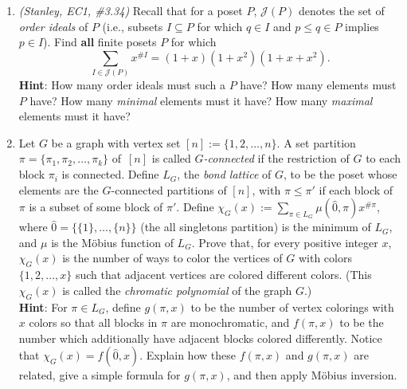 \documentclass[11pt]{article}
\begin{document}
\begin{enumerate}
\item \emph{(Stanley, EC1, \#3.34)} Recall that for a poset $P$, $\mathcal{J}(P)$ denotes the set of \emph{order ideals} of $P$ (i.e., subsets $I\subseteq P$ for which $q\in I$ and $p\leq q\in P$ implies $p\in I$). Find {\bf all} finite posets $P$ for which
\[ \sum_{I \in \mathcal{J}(P)} x^{\#I} = (1+x)(1+x^2)(1+x+x^2).\]
{\bf Hint}: How many order ideals must such a $P$ have? How many elements must $P$ have? How many \emph{minimal} elements must it have? How many \emph{maximal} elements must it have?

\item Let $G$ be a graph with vertex set $[n]:=\{1,2,\ldots,n\}$. A set partition $\pi=\{\pi_1,\pi_2,\ldots,\pi_k\}$ of~$[n]$ is called \emph{$G$-connected} if the restriction of $G$ to each block $\pi_i$ is connected. Define $L_G$, the \emph{bond lattice} of $G$, to be the poset whose elements are the $G$-connected partitions of $[n]$, with $\pi \leq \pi'$ if each block of $\pi$ is a subset of some block of $\pi'$. Define $\chi_G(x) := \sum_{\pi \in L_G} \mu(\hat{0},\pi) x^{\#\pi}$, where $\hat{0} = \{\{1\},\ldots,\{n\}\}$ (the all singletons partition) is the minimum of $L_G$, and $\mu$ is the M\"{o}bius function of $L_G$. Prove that, for every positive integer $x$, $\chi_G(x)$ is the number of ways to color the vertices of $G$ with colors $\{1,2,\ldots,x\}$ such that adjacent vertices are colored different colors. (This $\chi_G(x)$ is called the \emph{chromatic polynomial} of the graph $G$.) \\
{\bf Hint}: For $\pi \in L_G$, define $g(\pi,x)$ to be the number of vertex colorings with $x$ colors so that all blocks in $\pi$ are monochromatic, and $f(\pi,x)$ to be the number which additionally have adjacent blocks colored differently. Notice that $\chi_G(x) = f(\hat{0},x)$. Explain how these $f(\pi,x)$ and $g(\pi,x)$ are related, give a simple formula for $g(\pi,x)$, and then apply M\"{o}bius inversion.

\end{enumerate}
\end{document}
